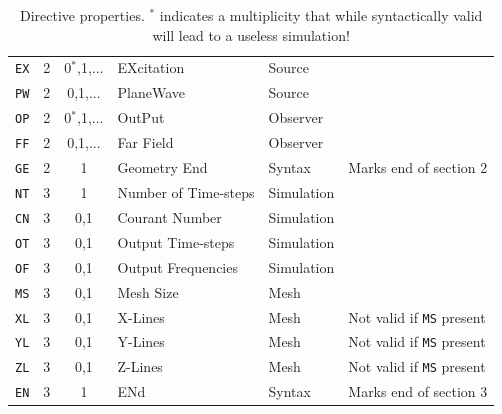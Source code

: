 \documentclass[onecolumn,a4paper]{article}
\numberwithin{equation}{section}
\begin{document}
\begin{table}[ht]
\begin{center}
{\begin{tabular}{|c|c|c|l|l|l|}
\texttt{EX} &2       &0$^*$,1,...  &EXcitation           &Source             &                       \\ 
\texttt{PW} &2       &0,1,...      &PlaneWave            &Source             &                       \\ 
\texttt{OP} &2       &0$^*$,1,...  &OutPut               &Observer           &                       \\ 
\texttt{FF} &2       &0,1,...      &Far Field            &Observer           &                       \\ 
\texttt{GE} &2       &1            &Geometry End         &Syntax             &Marks end of section 2 \\ 
\texttt{NT} &3       &1            &Number of Time-steps &Simulation         &                       \\ 
\texttt{CN} &3       &0,1          &Courant Number       &Simulation         &                       \\ 
\texttt{OT} &3       &0,1          &Output Time-steps    &Simulation         &                       \\ 
\texttt{OF} &3       &0,1          &Output Frequencies   &Simulation         &                       \\ 
\texttt{MS} &3       &0,1          &Mesh Size            &Mesh               &                       \\ 
\texttt{XL} &3       &0,1          &X-Lines              &Mesh               &Not valid if \texttt{MS} present \\ 
\texttt{YL} &3       &0,1          &Y-Lines              &Mesh               &Not valid if \texttt{MS} present \\ 
\texttt{ZL} &3       &0,1          &Z-Lines              &Mesh               &Not valid if \texttt{MS} present \\ 
\texttt{EN} &3       &1            &ENd                  &Syntax             &Marks end of section 3           \\ \hline
\end{tabular}
}
\caption{\label{tb:directives}Directive properties. $^*$ indicates a multiplicity that while syntactically valid
will lead to a useless simulation!}
\end{center}
\end{table}
\end{document}
